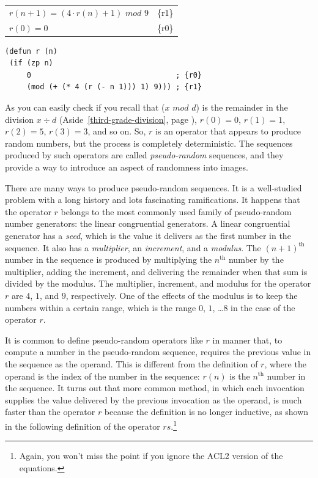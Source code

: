 \begin{center}
\begin{tabular}{ll}
$r(n+1) = (4\cdot r(n) + 1)$ $mod$ $9$ & \{r1\}\\
$r(0) = 0$                        & \{r0\}\\
\end{tabular}
\end{center}

\begin{Verbatim}
(defun r (n)
 (if (zp n)
     0                                 ; {r0}
     (mod (+ (* 4 (r (- n 1))) 1) 9))) ; {r1}
\end{Verbatim}

As you can easily check if you
recall that ($x$ $mod$ $d$) is the remainder in
the division $x \div d$
(Aside~\ref{third-grade-division}, page \pageref{third-grade-division}),
$r(0) = 0$, $r(1) = 1$, $r(2
) = 5$, $r(3) = 3$,
and so on.
So, $r$ is an operator that appears to produce random
numbers, but the process is completely deterministic.
The sequences produced by such operators
are called \emph{pseudo-random}
sequences,
and they provide a way to introduce an aspect of randomness into images.

There are many ways to produce pseudo-random sequences.
It is a well-studied problem with a long history and lots
fascinating ramifications. It happens that the operator
$r$ belongs to the most commonly used
family of pseudo-random number generators: the
linear congruential generators.
A linear congruential generator has a \emph{seed}, which is
the value it delivers as the first number in the sequence.
It also has a \emph{multiplier}, an \emph{increment}, and a \emph{modulus}.
The $(n+1)^\text{th}$ number in the sequence
is produced by multiplying the $n^\text{th}$ number by
the multiplier, adding the increment, and delivering
the remainder when that sum is divided by the modulus.
The multiplier, increment, and modulus for the operator $r$
are $4$, $1$, and $9$, respectively.
One of the effects of the modulus is to keep the numbers
within a certain range, which is the range $0$, $1$, \dots $8$ in
the case of the operator $r$.

It is common to define pseudo-random operators like $r$ in
manner that, to compute a number in the pseudo-random sequence,
requires the previous value in the sequence as the operand.
This is different from the definition of $r$, where the
operand is the index of the number in the sequence: $r(n)$ is the
$n^\text{th}$ number in the sequence.
It turns out that more common method,
in which each invocation
supplies the value delivered by the previous invocation as
the operand, is much faster than
the operator $r$
because the definition is no longer inductive,
as shown in the following definition of the operator
$rs$.\footnote{Again, you won't miss the point
if you ignore the ACL2 version of the equations.}

